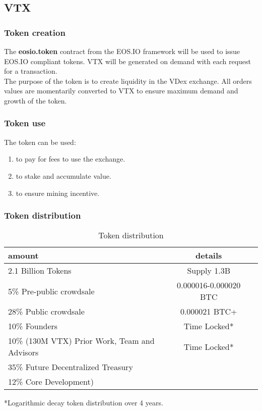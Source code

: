 \documentclass[]{article}
\begin{document}
\subsection{VTX}

\subsubsection{Token creation}
The \textbf{eosio.token} contract from the EOS.IO framework will be used to issue EOS.IO compliant tokens. 
VTX will be generated on demand with each request for a transaction. \\
The purpose of the token is to create liquidity in the VDex exchange.
All orders values are momentarily converted to VTX to ensure maximum demand and growth of the token.\\ 

\subsubsection{Token use}

The token can be used:
\begin{enumerate}
\item to pay for fees to use the exchange.
\item to stake and accumulate value.
\item to ensure mining incentive.
\end{enumerate}
 
\subsubsection{Token distribution}	
\begin{table}[h!]
	\begin{center}
		\caption{Token distribution}
		\label{tab:table1}
		\begin{tabular}{l|c|r}
			\textbf{amount} & \textbf{details} \\
			\hline
			2.1 Billion Tokens & Supply 1.3B \\
			\hline
			\hline
			5\%  Pre-public crowdsale & 0.000016-0.000020 BTC \\
			\hline
			28\% Public crowdsale & 0.000021 BTC+ \\
			\hline
			10\% Founders & Time Locked*\\
			\hline
			10\% (130M VTX) Prior Work, Team and Advisors & Time Locked*\\
			\hline
			35\% Future Decentralized Treasury\\
			\hline
			12\% Core Development)\\
			\hline				
		\end{tabular}
	\end{center}

*Logarithmic decay token distribution over 4 years.\\
\end{table}
\end{document}
